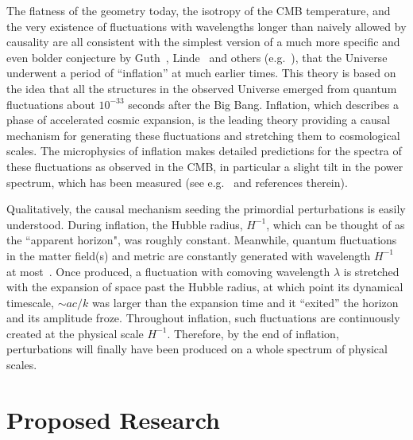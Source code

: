\documentclass[psfig,12pt]{article}
\def\ni{\noindent}
\begin{document}
\ni{\bf The Inflation of Our Universe:} The flatness of the geometry today, the isotropy of
the CMB temperature, and the very existence of fluctuations with
wavelengths longer than naively allowed by causality are all consistent
with the simplest version of a much more specific and even bolder
conjecture by Guth~\cite{Guth1981}, Linde~\cite{Linde1982a} and others
(e.g.~\cite{Mukhanov:1981xt, Sato1981, Hawking1982, Starobinsky1982,
Albrecht1982, Bardeen1983}), that the Universe underwent a period of
``inflation'' at much earlier times. This theory is based on the idea
that all the structures in the observed Universe emerged from quantum
fluctuations about $10^{-33}$ seconds after the Big Bang. Inflation,
which describes a phase of accelerated cosmic expansion, is the leading
theory providing a causal mechanism for generating these fluctuations
and stretching them to cosmological scales. The microphysics of
inflation makes detailed predictions for the spectra of these
fluctuations as observed in the CMB, in particular a slight tilt in the
power spectrum, which has been measured (see e.g.~\cite{Malik2008,
Gordon2000} and references therein).

Qualitatively, the causal mechanism seeding the primordial perturbations
is easily understood. During inflation, the Hubble radius, $H^{-1}$,
which can be thought of as the ``apparent horizon", was roughly
constant. Meanwhile, quantum fluctuations in the matter field(s) and
metric are constantly generated with wavelength $H ^{-1}$ at
most~\cite{BirrellsBook1984}. Once produced, a fluctuation with comoving
wavelength $\lambda$ is stretched with the expansion of space past the
Hubble radius, at which point its dynamical timescale, $\sim ac/k$ was
larger than the expansion time and it ``exited'' the horizon and its
amplitude froze.  Throughout inflation, such fluctuations are
continuously created at the physical scale $H^{-1}$. Therefore, by the
end of inflation, perturbations will finally have been produced on a
whole spectrum of physical scales.




\section{Proposed Research}
\label{sec:research}
\end{document}
